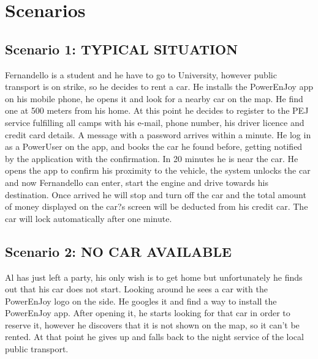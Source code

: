 \documentclass{article}
\begin{document}
\iffalse SECTION 3 \fi
\section{Scenarios}
\subsection{Scenario 1: TYPICAL SITUATION}
Fernandello is a student and he have to go to University, however public transport is on strike, so he decides to rent a car.  He installs the PowerEnJoy app on his mobile phone, he opens it and look for a nearby car on the map. He find one at 500 meters from his home. At this point he decides to register to the PEJ service fulfilling all camps with his e-mail, phone number, his driver licence and credit card details. A message with a password arrives within a minute. He log in as a PowerUser on the app, and books the car he found before, getting notified by the application with the confirmation. In 20 minutes he is near the car. He opens the app to confirm his proximity to the vehicle, the system unlocks the car and now Fernandello can enter, start the engine and drive towards his destination. Once arrived he will stop and turn off the car and the total amount of money displayed on the car?s screen will be deducted from his credit car. The car will lock automatically after one minute. 
\subsection{Scenario 2: NO CAR AVAILABLE}
Al has just left a party, his only wish is to get home but unfortunately he finds out that his car does not start. Looking around he sees a car with the PowerEnJoy logo on the side. He googles it and find a way to install the PowerEnJoy app. After opening it, he starts looking for that car in order to reserve it, however he discovers that it is not shown on the map, so it can't be rented. At that point he gives up and falls back to the night service of the local public transport.
\end{document}
